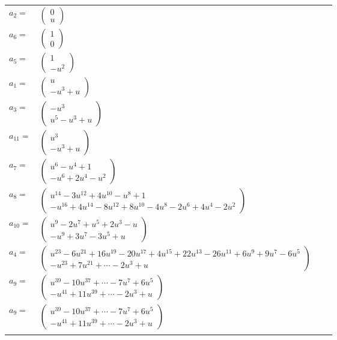 \documentclass[1p]{elsarticle_modified}
\theoremstyle{definition}
\begin{document}
\begin{tabular}{m{7pt} m{180pt} m{7pt} m{180pt} }
\flushright $a_{2}=$&$\begin{pmatrix}0\\u\end{pmatrix}$ \\
\flushright $a_{6}=$&$\begin{pmatrix}1\\0\end{pmatrix}$ \\
\flushright $a_{5}=$&$\begin{pmatrix}1\\- u^2\end{pmatrix}$ \\
\flushright $a_{1}=$&$\begin{pmatrix}u\\- u^3+u\end{pmatrix}$ \\
\flushright $a_{3}=$&$\begin{pmatrix}- u^3\\u^5- u^3+u\end{pmatrix}$ \\
\flushright $a_{11}=$&$\begin{pmatrix}u^3\\- u^3+u\end{pmatrix}$ \\
\flushright $a_{7}=$&$\begin{pmatrix}u^6- u^4+1\\- u^6+2 u^4- u^2\end{pmatrix}$ \\
\flushright $a_{8}=$&$\begin{pmatrix}u^{14}-3 u^{12}+4 u^{10}- u^8+1\\- u^{16}+4 u^{14}-8 u^{12}+8 u^{10}-4 u^8-2 u^6+4 u^4-2 u^2\end{pmatrix}$ \\
\flushright $a_{10}=$&$\begin{pmatrix}u^9-2 u^7+u^5+2 u^3- u\\- u^9+3 u^7-3 u^5+u\end{pmatrix}$ \\
\flushright $a_{4}=$&$\begin{pmatrix}u^{23}-6 u^{21}+16 u^{19}-20 u^{17}+4 u^{15}+22 u^{13}-26 u^{11}+6 u^9+9 u^7-6 u^5\\- u^{23}+7 u^{21}+\cdots-2 u^3+u\end{pmatrix}$ \\
\flushright $a_{9}=$&$\begin{pmatrix}u^{39}-10 u^{37}+\cdots-7 u^7+6 u^5\\- u^{41}+11 u^{39}+\cdots-2 u^3+u\end{pmatrix}$\\ \flushright $a_{9}=$&$\begin{pmatrix}u^{39}-10 u^{37}+\cdots-7 u^7+6 u^5\\- u^{41}+11 u^{39}+\cdots-2 u^3+u\end{pmatrix}$\\&\end{tabular}
\end{document}
